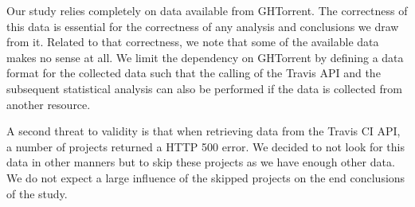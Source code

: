 Our study relies completely on data available from GHTorrent. 
The correctness of this data is essential for the correctness of any analysis and conclusions we draw from it.
Related to that correctness, we note that some of the available data makes no sense at all.
We limit the dependency on GHTorrent by defining a data format for the collected data such that the calling of the Travis API and the subsequent statistical analysis can also be performed if the data is collected from another resource.

A second threat to validity is that when retrieving data from the Travis CI API, a number of projects returned a HTTP 500 error.
We decided to not look for this data in other manners but to skip these projects as we have enough other data.
We do not expect a large influence of the skipped projects on the end conclusions of the study.
